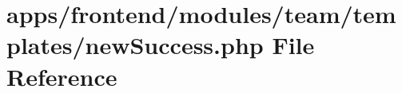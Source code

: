 \hypertarget{frontend_2modules_2team_2templates_2new_success_8php}{\section{apps/frontend/modules/team/templates/new\-Success.php File Reference}
\label{frontend_2modules_2team_2templates_2new_success_8php}
}

